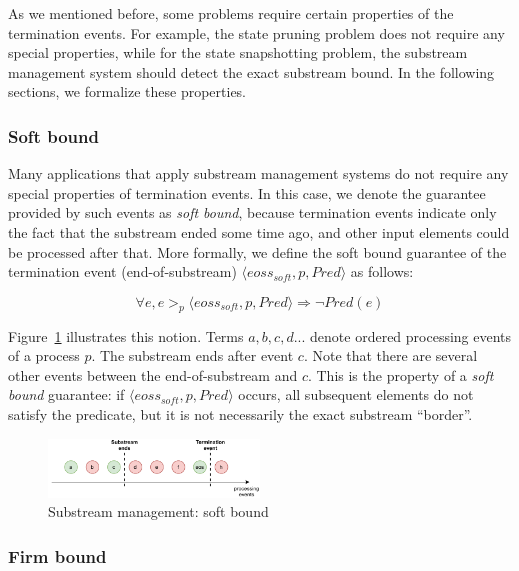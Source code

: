 As we mentioned before, some problems require certain properties of the termination events. For example, the state pruning problem does not require any special properties, while for the state snapshotting problem, the substream management system should detect the exact substream bound. In the following sections, we formalize these properties. 

\subsubsection{Soft bound}

Many applications that apply substream management systems do not require any special properties of termination events. In this case, we denote the guarantee provided by such events as {\em soft bound}, because termination events indicate only the fact that the substream ended some time ago, and other input elements could be processed after that. More formally, we define the soft bound guarantee of the termination event (end-of-substream) $\langle eoss_{soft}, p, Pred\rangle$ as follows:

\begin{equation}
\forall e, e >_p \langle eoss_{soft}, p, Pred\rangle \Rightarrow \neg Pred(e)
\end{equation}

Figure~\ref{general_guarantees} illustrates this notion. Terms $a,b,c,d...$ denote ordered processing events of a process $p$. The substream ends after event $c$. Note that there are several other events between the end-of-substream and $c$. This is the property of a {\em soft bound} guarantee: if $\langle eoss_{soft}, p, Pred\rangle$ occurs, all subsequent elements do not satisfy the predicate, but it is not necessarily the exact substream ``border''.

\begin{figure}[t]
  \centering
  \includegraphics[width=0.50\textwidth]{pics/general-guarantee.pdf}
  \caption{Substream management: soft bound}
  \label{general_guarantees}
\end{figure}

\subsubsection{Firm bound}

